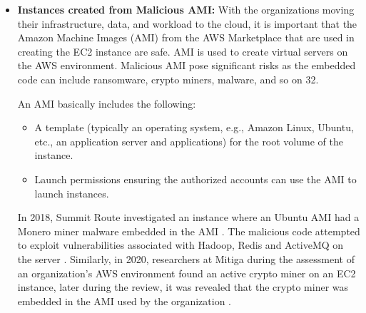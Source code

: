 \begin{itemize}
    \item \textbf{Instances created from Malicious AMI:} With the organizations moving their infrastructure, data,
    and workload to the cloud, it is important that the Amazon Machine Images (AMI) from the AWS Marketplace that are
    used in creating the EC2 instance are safe. AMI is used to create virtual servers on the AWS environment.
    Malicious AMI pose significant risks as the embedded code can include ransomware, crypto miners, malware, and so
    on {32}.

    An AMI basically includes the following:
    \begin{itemize}
        \item A template (typically an operating system, e.g., Amazon Linux, Ubuntu, etc., an application server and applications) for the root volume of the instance.
    \end{itemize}
    \begin{itemize}
        \item Launch permissions ensuring the authorized accounts can use the AMI to launch instances.
    \end{itemize}
    In 2018, Summit Route investigated an instance where an Ubuntu AMI had a Monero miner malware embedded in the AMI
    .
    The malicious code attempted to exploit vulnerabilities associated with Hadoop, Redis and ActiveMQ on the
    server \cite{47}.
    Similarly, in 2020, researchers at Mitiga during the assessment of an organization’s AWS environment found an
    active crypto miner on an EC2 instance, later during the review, it was revealed that the crypto miner was
    embedded in the AMI used by the organization \cite{48}.
\end{itemize}

